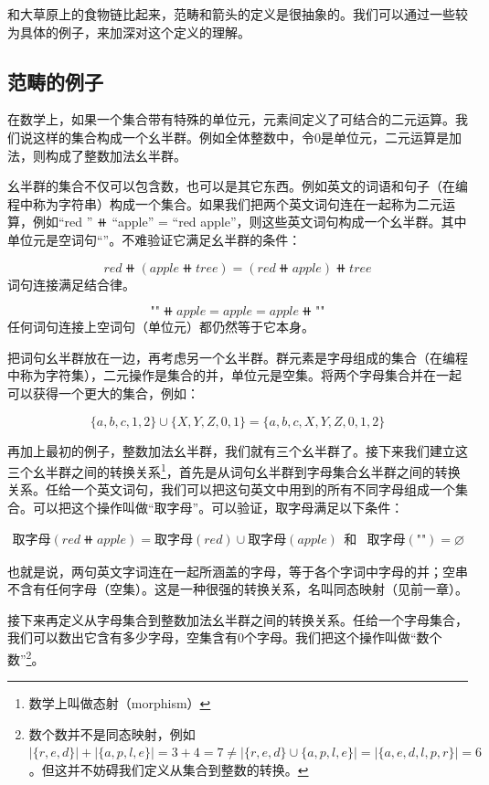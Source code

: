 \documentclass[b5paper]{ctexart}
\begin{document}
和大草原上的食物链比起来，范畴和箭头的定义是很抽象的。我们可以通过一些较为具体的例子，来加深对这个定义的理解。

\subsection{范畴的例子}

在数学上，如果一个集合带有特殊的单位元，元素间定义了可结合的二元运算。我们说这样的集合构成一个幺半群。例如全体整数中，令0是单位元，二元运算是加法，则构成了整数加法幺半群。

幺半群的集合不仅可以包含数，也可以是其它东西。例如英文的词语和句子（在编程中称为字符串）构成一个集合。如果我们把两个英文词句连在一起称为二元运算，例如“red ” $\doubleplus$ “apple” = “red apple”，则这些英文词句构成一个幺半群。其中单位元是空词句“”。不难验证它满足幺半群的条件：

\[
red \doubleplus (apple \doubleplus tree) = (red \doubleplus apple) \doubleplus tree
\]
词句连接满足结合律。

\[
\texttt{""} \doubleplus apple = apple = apple \doubleplus \texttt{""}
\]
任何词句连接上空词句（单位元）都仍然等于它本身。

把词句幺半群放在一边，再考虑另一个幺半群。群元素是字母组成的集合（在编程中称为字符集），二元操作是集合的并，单位元是空集。将两个字母集合并在一起可以获得一个更大的集合，例如：

\[
\{a, b, c, 1, 2\} \cup \{X, Y, Z, 0, 1\} = \{a, b, c, X, Y, Z, 0, 1, 2\}
\]

再加上最初的例子，整数加法幺半群，我们就有三个幺半群了。接下来我们建立这三个幺半群之间的转换关系\footnote{数学上叫做态射（morphism）}，首先是从词句幺半群到字母集合幺半群之间的转换关系。任给一个英文词句，我们可以把这句英文中用到的所有不同字母组成一个集合。可以把这个操作叫做“取字母”。可以验证，取字母满足以下条件：

\[
\begin{array}{rcl}
\text{取字母}(red \doubleplus apple) = \text{取字母}(red) \cup \text{取字母}(apple) & \text{和} & \text{取字母}(\texttt{""}) = \varnothing
\end{array}
\]

也就是说，两句英文字词连在一起所涵盖的字母，等于各个字词中字母的并；空串不含有任何字母（空集）。这是一种很强的转换关系，名叫同态映射（见前一章）。

接下来再定义从字母集合到整数加法幺半群之间的转换关系。任给一个字母集合，我们可以数出它含有多少字母，空集含有0个字母。我们把这个操作叫做“数个数”\footnote{数个数并不是同态映射，例如$|\{r, e, d\}| + |\{a, p, l, e\}| = 3 + 4 = 7 \neq |\{r, e, d\} \cup \{a, p, l, e\}| = |\{a, e, d, l, p, r\}| = 6$。但这并不妨碍我们定义从集合到整数的转换。}。
\end{document}
